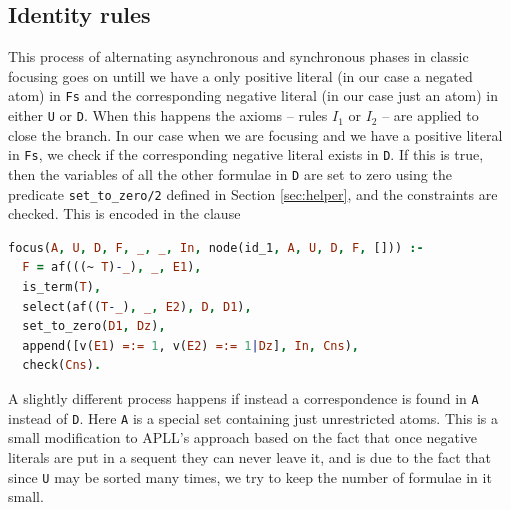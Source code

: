 \documentclass[a4paper, 12pt, tesi, english]{report}
\begin{document}
\subsection{Identity rules}
This process of alternating asynchronous and synchronous phases in classic focusing goes on untill we have a only positive literal (in our case a negated atom) in \texttt{Fs} and the corresponding negative literal (in our case just an atom) in either \texttt{U} or \texttt{D}.
When this happens the axioms -- rules $I_1$ or $I_2$ -- are applied to close the branch.
In our case when we are focusing and we have a positive literal in \texttt{Fs}, we check if the corresponding negative literal exists in \texttt{D}.
If this is true, then the variables of all the other formulae in \texttt{D} are set to zero using the predicate \texttt{set\_to\_zero/2} defined in Section \ref{sec:helper}, and the constraints are checked.
This is encoded in the clause 
\begin{lstlisting}[language=prolog]
focus(A, U, D, F, _, _, In, node(id_1, A, U, D, F, [])) :-
  F = af(((~ T)-_), _, E1),
  is_term(T),
  select(af((T-_), _, E2), D, D1),
  set_to_zero(D1, Dz),
  append([v(E1) =:= 1, v(E2) =:= 1|Dz], In, Cns),
  check(Cns).
\end{lstlisting}
A slightly different process happens if instead a correspondence is found in \texttt{A} instead of \texttt{D}.
Here \texttt{A} is a special set containing just unrestricted atoms.
This is a small modification to APLL's approach based on the fact that once negative literals are put in a sequent they can never leave it, and is due to the fact that since \texttt{U} may be sorted many times, we try to keep the number of formulae in it small.
\end{document}
